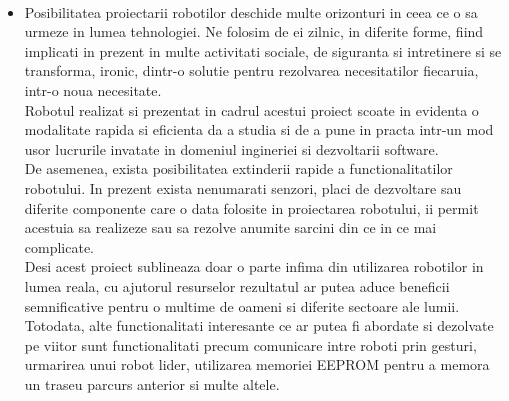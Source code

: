 
\paragraph{}
\begin{itemize}
\item
	\tab Posibilitatea proiectarii robotilor deschide multe orizonturi in ceea ce o sa urmeze in lumea tehnologiei. Ne folosim de ei zilnic, in diferite forme, fiind implicati in prezent  in multe activitati sociale, de siguranta si intretinere si se transforma, ironic, dintr-o solutie pentru rezolvarea necesitatilor fiecaruia, intr-o noua necesitate.\\
	\tab Robotul realizat si prezentat in cadrul acestui proiect scoate in evidenta o modalitate rapida si eficienta da a studia si de a pune in practa intr-un mod usor lucrurile invatate in domeniul ingineriei si dezvoltarii software. \\
	\tab De asemenea, exista posibilitatea extinderii rapide a functionalitatilor robotului. In prezent exista nenumarati senzori, placi de dezvoltare sau diferite componente care o data folosite in proiectarea robotului, ii permit acestuia sa realizeze sau  sa rezolve anumite sarcini din ce in ce mai complicate.\\
	\tab Desi acest proiect sublineaza doar o parte infima din utilizarea robotilor in lumea reala, cu ajutorul resurselor rezultatul ar putea aduce beneficii semnificative pentru o multime de oameni si diferite sectoare ale lumii.\\
	\tab Totodata, alte functionalitati interesante ce ar putea fi abordate si dezolvate pe viitor sunt functionalitati precum comunicare intre roboti prin gesturi, urmarirea unui robot lider, utilizarea memoriei EEPROM pentru a memora un traseu parcurs anterior si multe altele.\\

\end{itemize}
